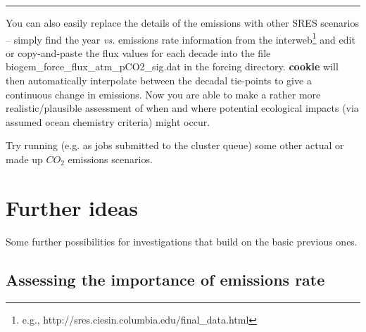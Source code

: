 \vspace{1mm} \noindent\rule{4cm}{0.1mm} \vspace{2mm}

\noindent You can also easily replace the details of the emissions with other SRES scenarios – simply find the year \textit{vs.} emissions rate information from the interweb\footnote{e.g., http://sres.ciesin.columbia.edu/final\_data.html} and edit or copy-and-paste the flux values for each decade into the file \footnotesize\textsf{biogem\_force\_flux\_atm\_pCO2\_sig.dat }\normalsize in the forcing directory.\textbf{ cookie} will then automatically interpolate between the decadal tie-points to give a continuous change in emissions. Now you are able to make a rather more realistic/plausible assessment of when and where potential ecological impacts (via assumed ocean chemistry criteria) might occur.

Try running (e.g. as jobs submitted to the cluster queue) some other actual or made up $CO_{2}$ emissions scenarios.

\newpage

\section{Further ideas}

Some further possibilities for investigations that build on the basic previous ones. 


\subsection{Assessing the importance of emissions rate}

